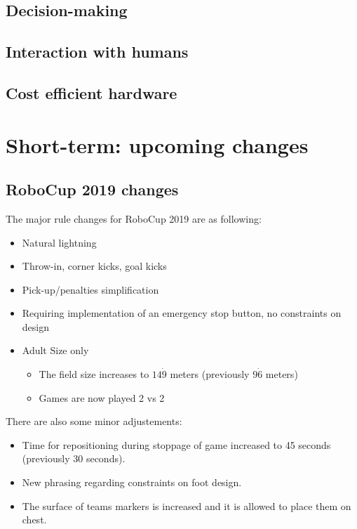 \documentclass{article}
\begin{document}
\subsection{Decision-making}

\subsection{Interaction with humans}

\subsection{Cost efficient hardware}

\section{\label{sec:ShortTerm}Short-term: upcoming changes}

\subsection{RoboCup 2019 changes}

The major rule changes for RoboCup 2019 are as following:

\begin{itemize}
\item Natural lightning
\item Throw-in, corner kicks, goal kicks %
\item Pick-up/penalties simplification
\item Requiring implementation of an emergency stop button, no constraints on design
\item Adult Size only
  \begin{itemize}
  \item The field size increases to $14 \dot 9$ meters (previously $9 \dot 6$ meters)
  \item Games are now played 2 vs 2
  \end{itemize}
\end{itemize}

There are also some minor adjustements:

\begin{itemize}
\item Time for repositioning during stoppage of game increased to 45 seconds (previously 30 seconds).
\item New phrasing regarding constraints on foot design.
\item The surface of teams markers is increased and it is allowed to place them on chest.
\end{itemize}
\end{document}
